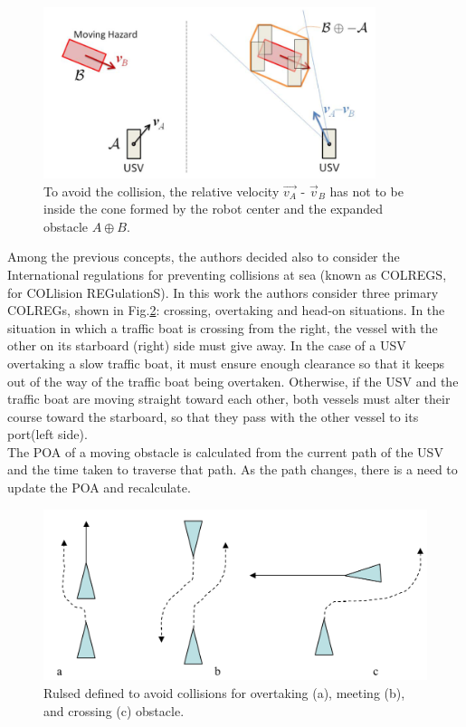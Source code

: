 \documentclass[12pt]{article}
\begin{document}
              \begin{figure}
                    \centering
                    \includegraphics[height=5cm]{./Images/Kuwata/obs_vel}
                    \caption{To avoid the collision, the relative velocity $\vec{v_A}$ - $\vec{v}_B$ has not to be inside the cone formed by the robot center and the expanded obstacle $A\oplus B$.}
                    \label{fig:obs_vel}
              \end{figure}

              Among the previous concepts, the authors decided also to consider the International regulations for preventing collisions at sea (known as COLREGS, for COLlision REGulationS). In this work the authors consider three primary COLREGs, shown in Fig.\ref{fig:colregs}: crossing, overtaking and head-on situations. In the situation in which a traffic boat is crossing from the right, the vessel with the other on its starboard (right) side must give away. In the case of a USV overtaking a slow traffic boat, it must ensure enough clearance so that it keeps out of the way of the traffic boat being overtaken. Otherwise, if the USV and the traffic boat are moving straight toward each other, both vessels must alter their course toward the starboard, so that they pass with the other vessel to its port(left side).\\
              The POA of a moving obstacle is calculated from the current path of the USV and the time taken to traverse that path. As the path changes, there is a need to update the POA and recalculate.

              \begin{figure}
                    \centering
                    \includegraphics[height=5cm]{./Images/Larson/colregs}
                    \caption{Rulsed defined to avoid collisions for overtaking (a), meeting (b), and crossing (c) obstacle.}
                    \label{fig:colregs}
              \end{figure}
\end{document}
